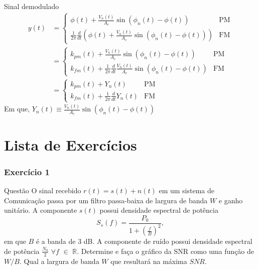 \documentclass[aspectratio=169,dvipsnames]{beamer}
\begin{document}
\begin{frame}{Sinal demodulado}
\begin{align*}
y(t) &= \left\{
\begin{array}{ll}
\phi(t) + \frac{V_n(t)}{A_c} \sin(\phi_n(t) - \phi(t)) & \text{PM} \\
\frac{1}{2\pi} \frac{d}{dt} \left( \phi(t) + \frac{V_n(t)}{A_c} \sin(\phi_n(t) - \phi(t)) \right) & \text{FM}
\end{array}
\right.
\\
&= \left\{
\begin{array}{ll}
k_{pm}(t) + \frac{V_n(t)}{A_c} \sin(\phi_n(t) - \phi(t)) & \text{PM} \\
k_{fm}(t) + \frac{1}{2\pi} \frac{d}{dt} \frac{V_n(t)}{A_c} \sin(\phi_n(t) - \phi(t)) & \text{FM}
\end{array}
\right.
\\
&= \left\{
\begin{array}{ll}
k_{pm}(t) + Y_n(t) & \text{PM} \\
k_{fm}(t) + \frac{1}{2\pi} \frac{d}{dt} Y_n(t) & \text{FM}
\end{array}
\right.
\end{align*}
Em que,
$Y_n(t) \equiv \frac{V_n(t)}{A_c} \sin\left(\phi_n(t) - \phi(t)\right) $
\end{frame}


\section{Lista de Exercícios}
\begin{frame}
  \frametitle{Exercício 1}

  \begin{block}{Questão}
    O sinal recebido $r(t) = s(t) + n(t)$ em um sistema de Comunicação
    passa por um filtro passa-baixa de largura de banda $W$ e ganho unitário.
    A componente $s(t)$ possui densidade espectral de potência
    $$
    S_s(f) = \frac{P_0}{1+\left(\frac{f}{B}\right)^2},
    $$
    em que $B$ é a banda de 3 dB. A componente de ruído possui densidade
    espectral de potência $\frac{N_0}{2}$ $\forall f$ $\in$ $\mathbb{R}$. Determine e
    faça o gráfico da SNR como uma função de $W/B$. Qual a largura de banda $W$ que 
    resultará na máxima $SNR$.
  \end{block}

\end{frame}
\end{document}
